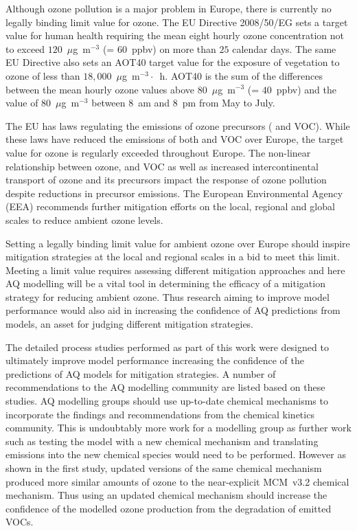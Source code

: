 Although ozone pollution is a major problem in Europe, there is currently no legally binding limit value for ozone.
The EU Directive 2008/50/EG sets a target value for human health requiring the mean eight hourly ozone concentration not to exceed $120$~$\mu$g~m$^{-3}$ (= $60$~ppbv) on more than $25$ calendar days.
The same EU Directive also sets an AOT40 target value for the exposure of vegetation to ozone of less than $18,000$~$\mu$g~m$^{-3} \cdot$~h. 
AOT40 is the sum of the differences between the mean hourly ozone values above $80$~$\mu$g~m$^{-3}$ (= $40$~ppbv) and the value of $80$~$\mu$g~m$^{-3}$ between 8~am and 8~pm from May to July.

The EU has laws regulating the emissions of ozone precursors ( and VOC).
While these laws have reduced the emissions of both  and VOC over Europe, the target value for ozone is regularly exceeded throughout Europe.
The non-linear relationship between ozone,  and VOC as well as increased intercontinental transport of ozone and its precursors impact the response of ozone pollution despite reductions in precursor emissions.
The European Environmental Agency (EEA) recommends further mitigation efforts on the local, regional and global scales to reduce ambient ozone levels.

Setting a legally binding limit value for ambient ozone over Europe should inspire mitigation strategies at the local and regional scales in a bid to meet this limit.
Meeting a limit value requires assessing different mitigation approaches and here AQ modelling will be a vital tool in determining the efficacy of a mitigation strategy for reducing ambient ozone. 
Thus research aiming to improve model performance would also aid in increasing the confidence of AQ predictions from models, an asset for judging different mitigation strategies.

The detailed process studies performed as part of this work were designed to ultimately improve model performance increasing the confidence of the predictions of AQ models for mitigation strategies.
A number of recommendations to the AQ modelling community are listed based on these studies.
AQ modelling groups should use up-to-date chemical mechanisms to incorporate the findings and recommendations from the chemical kinetics community.
This is undoubtably more work for a modelling group as further work such as testing the model with a new chemical mechanism and translating emissions into the new chemical species would need to be performed.
However as shown in the first study, updated versions of the same chemical mechanism produced more similar amounts of ozone to the near-explicit MCM~v3.2 chemical mechanism.
Thus using an updated chemical mechanism should increase the confidence of the modelled ozone production from the degradation of emitted VOCs.

